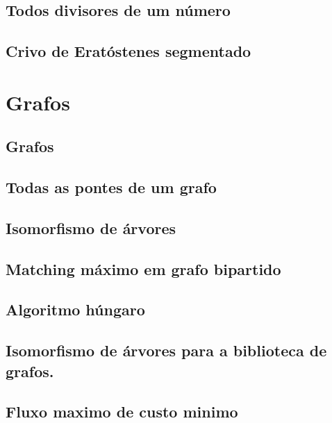 \subsection{Todos divisores de um número}
\raggedbottom
\clearpage
\subsection{Crivo de Eratóstenes segmentado}
\raggedbottom
\clearpage
\clearpage
\section{Grafos}
\subsection{Grafos}
\raggedbottom
\clearpage
\subsection{Todas as pontes de um grafo}
\raggedbottom
\clearpage
\subsection{Isomorfismo de árvores}
\raggedbottom
\clearpage
\subsection{Matching máximo em grafo bipartido}
\raggedbottom
\clearpage
\subsection{Algoritmo húngaro}
\raggedbottom
\clearpage
\subsection{Isomorfismo de árvores para a biblioteca de grafos.}
\raggedbottom
\clearpage
\subsection{Fluxo maximo de custo minimo}
\raggedbottom
\clearpage
\clearpage
